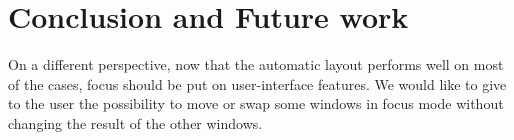 \documentclass{acmtog}
\begin{document}
\section{Conclusion and Future work}



On a different perspective, now that the automatic layout performs well on most of the cases, focus should be put on user-interface features. We would like to give to the user the possibility to move or swap some windows in focus mode without changing the result of the other windows. 
\begin{acks}
 
\end{acks}




 
\end{document}
